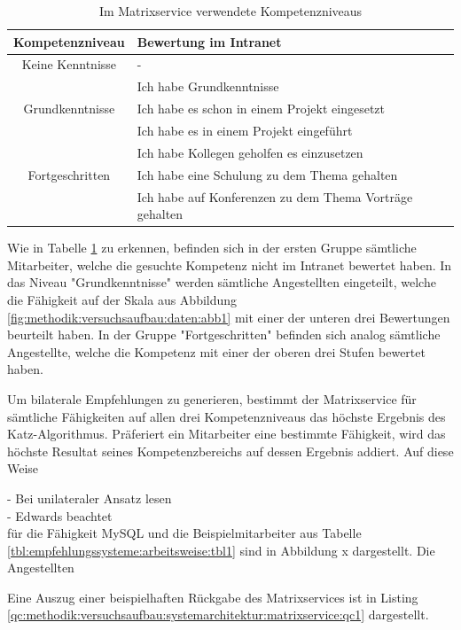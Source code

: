 \begin{table}[h]
	\centering
	\begin{tabularx}{\textwidth}{c|X}
		\textbf{Kompetenzniveau} & \textbf{Bewertung im Intranet}\\
		\hline
		Keine Kenntnisse & -\\
		\hline
		& Ich habe Grundkenntnisse\\
		Grundkenntnisse & Ich habe es schon in einem Projekt eingesetzt\\
		& Ich habe es in einem Projekt eingeführt\\
		\hline
		& Ich habe Kollegen geholfen es einzusetzen\\
		Fortgeschritten & Ich habe eine Schulung zu dem Thema gehalten\\
		& Ich habe auf Konferenzen zu dem Thema Vorträge gehalten\\
		\hline
	\end{tabularx}
	\caption{Im Matrixservice verwendete Kompetenzniveaus}
	\label{tbl:methodik:versuchsaufbau:systemarchitektur:matrixservice:tbl1}
\end{table}

Wie in Tabelle \ref{tbl:methodik:versuchsaufbau:systemarchitektur:matrixservice:tbl1} zu erkennen, befinden sich in der ersten Gruppe sämtliche Mitarbeiter, welche die gesuchte Kompetenz nicht im Intranet bewertet haben. In das Niveau "Grundkenntnisse" werden sämtliche Angestellten eingeteilt, welche die Fähigkeit auf der Skala aus Abbildung \ref{fig:methodik:versuchsaufbau:daten:abb1} mit einer der unteren drei Bewertungen beurteilt haben. In der Gruppe "Fortgeschritten" befinden sich analog sämtliche Angestellte, welche die Kompetenz mit einer der oberen drei Stufen bewertet haben.

Um bilaterale Empfehlungen zu generieren, bestimmt der Matrixservice für sämtliche Fähigkeiten auf allen drei Kompetenzniveaus das höchste Ergebnis des Katz-Algorithmus. Präferiert ein Mitarbeiter eine bestimmte Fähigkeit, wird das höchste Resultat seines Kompetenzbereichs auf dessen Ergebnis addiert. Auf diese Weise 

\newpage
- Bei unilateraler Ansatz lesen\\
- Edwards beachtet\\
für die Fähigkeit MySQL und die Beispielmitarbeiter aus Tabelle \ref{tbl:empfehlungssysteme:arbeitsweise:tbl1} sind in Abbildung x dargestellt. Die Angestellten 




Eine Auszug einer beispielhaften Rückgabe des Matrixservices ist in Listing \ref{qc:methodik:versuchsaufbau:systemarchitektur:matrixservice:qc1} dargestellt.

